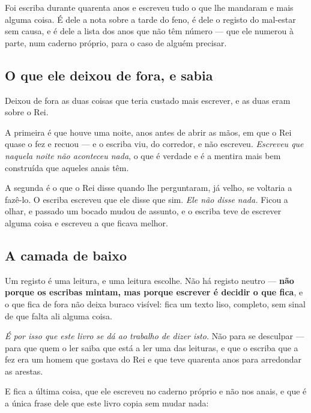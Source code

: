 \documentclass[livro.tex]{subfiles}
\begin{document}
\medskip

Foi escriba durante quarenta anos e escreveu tudo o que lhe mandaram e mais alguma coisa. É dele a
nota sobre a tarde do feno, é dele o registo do mal-estar sem causa, e é dele a lista dos anos que
não têm número --- que ele numerou à parte, num caderno próprio, para o caso de alguém precisar.

\subsection*{O que ele deixou de fora, e sabia}

Deixou de fora as duas coisas que teria custado mais escrever, e as duas eram sobre o Rei.

\medskip

A primeira é que houve uma noite, anos antes de abrir as mãos, em que o Rei quase o fez e recuou
--- e o escriba viu, do corredor, e não escreveu. \emph{Escreveu que naquela noite não aconteceu
nada}, o que é verdade e é a mentira mais bem construída que aqueles anais têm.

\medskip

A segunda é o que o Rei disse quando lhe perguntaram, já velho, se voltaria a fazê-lo. O escriba
escreveu que ele disse que sim. \emph{Ele não disse nada.} Ficou a olhar, e passado um bocado
mudou de assunto, e o escriba teve de escrever alguma coisa e escreveu a que ficava melhor.

\subsection*{A camada de baixo}

Um registo é uma leitura, e uma leitura escolhe. Não há registo neutro --- \textbf{não porque os
escribas mintam, mas porque escrever é decidir o que fica}, e o que fica de fora não deixa buraco
visível: fica um texto liso, completo, sem sinal de que falta ali alguma coisa.

\medskip

\emph{É por isso que este livro se dá ao trabalho de dizer isto.} Não para se desculpar --- para
que quem o ler saiba que está a ler uma das leituras, e que o escriba que a fez era um homem que
gostava do Rei e que teve quarenta anos para arredondar as arestas.

\medskip

E fica a última coisa, que ele escreveu no caderno próprio e não nos anais, e que é a única frase
dele que este livro copia sem mudar nada:
\end{document}
